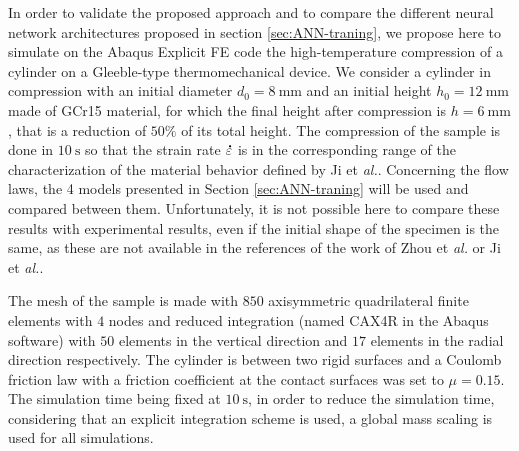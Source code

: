 \documentclass[algorithms,article,submit,pdftex,moreauthors]{Definitions/mdpi}
\makeatletter
\DeclareRobustCommand{\mdot}[1]{\accentset{\mbox{\bfseries .}}{#1}}
\DeclareRobustCommand{\eal}{et \emph{al.}\@\xspace}
\makeatother
\begin{document}
In order to validate the proposed approach and to compare the different neural network architectures proposed in section \ref{sec:ANN-traning}, we propose here to simulate on the Abaqus Explicit FE code the high-temperature compression of a cylinder on a Gleeble-type thermomechanical device.
We consider a cylinder in compression with an initial diameter $d_0=8~\text{mm}$ and an initial height $h_0=12~\text{mm}$ made of GCr15 material, for which the final height after compression is $h=6~\text{mm}$, that is a reduction of $50\%$ of its total height.
The compression of the sample is done in $10~\text{s}$ so that the strain rate  $\mdot\varepsilon$ is in the corresponding range of the characterization of the material behavior defined by Ji \eal \cite{Ji-2018}.
Concerning the flow laws, the 4 models presented in Section \ref{sec:ANN-traning} will be used and compared between them.
Unfortunately, it is not possible here to compare these results with experimental results, even if the initial shape of the specimen is the same, as these are not available in the references of the work of Zhou \eal \cite{Zhou-2020} or Ji \eal \cite{Ji-2018}.

The mesh of the sample is made with $850$ axisymmetric quadrilateral finite elements with $4$ nodes and reduced integration (named CAX4R in the Abaqus software) with $50$ elements in the vertical direction and $17$ elements in the radial direction respectively.
The cylinder is between two rigid surfaces and a Coulomb friction law with a friction coefficient at the contact surfaces was set to $\mu=0.15$.
The simulation time being fixed at $10~\text{s}$, in order to reduce the simulation time, considering that an explicit integration scheme is used, a global mass scaling is used for all simulations.
\end{document}
